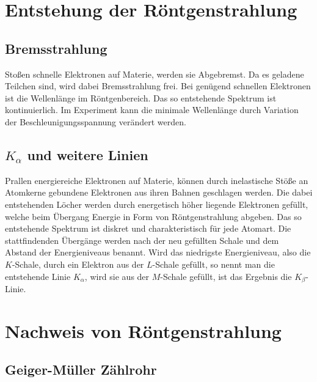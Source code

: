 \section{Entstehung der Röntgenstrahlung}


\parencite[Abschnitt~17.3.1]{meschede-gerthsen_24}

\subsection{Bremsstrahlung}

Stoßen schnelle Elektronen auf Materie, werden sie Abgebremst. Da es geladene
Teilchen sind, wird dabei Bremsstrahlung frei. Bei genügend schnellen
Elektronen ist die Wellenlänge im Röntgenbereich. Das so entstehende Spektrum
ist kontinuierlich. Im Experiment kann die minimale Wellenlänge durch
Variation der Beschleunigungsspannung verändert werden.

\parencite[Abschnitt~17.3.4]{meschede-gerthsen_24}

\subsection{$K_\alpha$ und weitere Linien}

Prallen energiereiche Elektronen auf Materie, können durch inelastische Stöße
an Atomkerne gebundene Elektronen aus ihren Bahnen geschlagen werden. Die
dabei entstehenden Löcher werden durch energetisch höher liegende Elektronen
gefüllt, welche beim Übergang Energie in Form von Röntgenstrahlung abgeben.
Das so entstehende Spektrum ist diskret und charakteristisch für jede Atomart.
Die stattfindenden Übergänge werden nach der neu gefüllten Schale und dem
Abstand der Energieniveaus benannt. Wird das niedrigste Energieniveau, also
die $K$-Schale, durch ein Elektron aus der $L$-Schale gefüllt, so nennt man
die entstehende Linie $K_\alpha$, wird sie aus der $M$-Schale gefüllt, ist das
Ergebnis die $K_\beta$-Linie.

\parencite[Abschnitt~17.3.5]{meschede-gerthsen_24}

\section{Nachweis von Röntgenstrahlung}

\subsection{Geiger-Müller Zählrohr}

